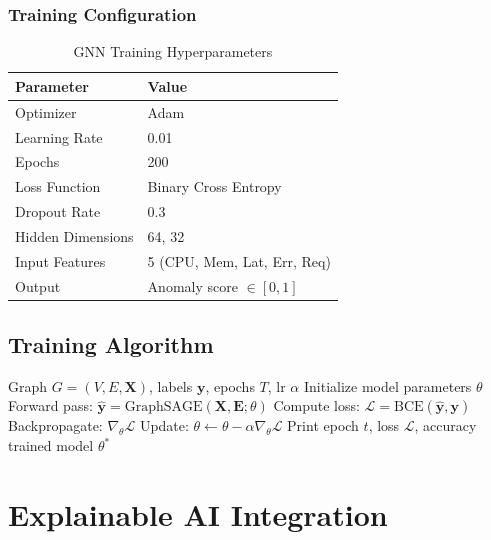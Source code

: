 \documentclass[12pt,a4paper]{report}
\begin{document}
\subsection{Training Configuration}

\begin{table}[H]
\centering
\caption{GNN Training Hyperparameters}
\begin{tabular}{ll}
\toprule
\textbf{Parameter} & \textbf{Value} \\
\midrule
Optimizer          & Adam \\
Learning Rate      & 0.01 \\
Epochs             & 200 \\
Loss Function      & Binary Cross Entropy \\
Dropout Rate       & 0.3 \\
Hidden Dimensions  & 64, 32 \\
Input Features     & 5 (CPU, Mem, Lat, Err, Req) \\
Output             & Anomaly score $\in [0,1]$ \\
\bottomrule
\end{tabular}
\end{table}

\section{Training Algorithm}

\begin{algorithm}[H]
\caption{GraphSAGE Training for Anomaly Detection}
\begin{algorithmic}[1]
\Require Graph $G=(V,E,\mathbf{X})$, labels $\mathbf{y}$,
         epochs $T$, lr $\alpha$
\State Initialize model parameters $\theta$
  \State Forward pass: $\hat{\mathbf{y}} = \text{GraphSAGE}(\mathbf{X},
         \mathbf{E}; \theta)$
  \State Compute loss: $\mathcal{L} = \text{BCE}(\hat{\mathbf{y}},
         \mathbf{y})$
  \State Backpropagate: $\nabla_\theta \mathcal{L}$
  \State Update: $\theta \leftarrow \theta - \alpha \nabla_\theta
         \mathcal{L}$
    \State Print epoch $t$, loss $\mathcal{L}$, accuracy
  \EndIf
\EndFor
\State \Return trained model $\theta^*$
\end{algorithmic}
\end{algorithm}

\chapter{Explainable AI Integration}
\end{document}
